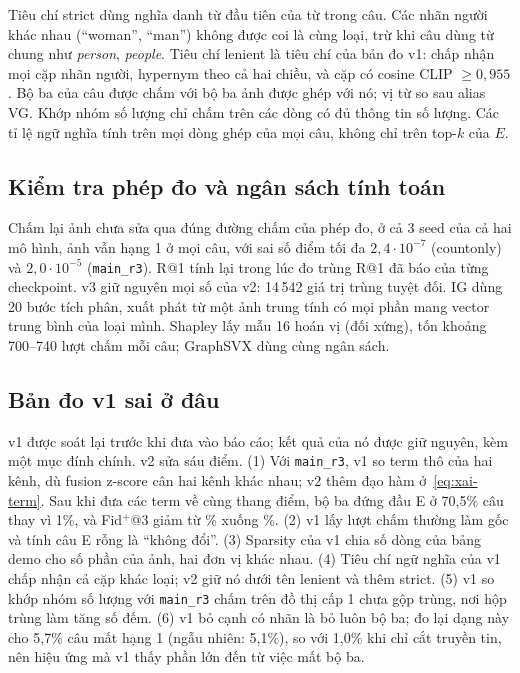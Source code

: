Tiêu chí strict dùng nghĩa danh từ đầu tiên của từ trong câu. Các nhãn người khác nhau (``woman'', ``man'') không được coi là
cùng loại, trừ khi câu dùng từ chung như \emph{person}, \emph{people}. Tiêu chí lenient là tiêu chí của bản đo v1: chấp nhận
mọi cặp nhãn người, hypernym theo cả hai chiều, và cặp có cosine CLIP $\ge0{,}955$. Bộ ba của câu được chấm với bộ ba ảnh được
ghép với nó; vị từ so sau alias VG. Khớp nhóm số lượng chỉ chấm trên các dòng có đủ thông tin số lượng. Các tỉ lệ ngữ nghĩa
tính trên mọi dòng ghép của mọi câu, không chỉ trên top-$k$ của $E$.

\subsection{Kiểm tra phép đo và ngân sách tính toán}\label{sec:xai-checks}
Chấm lại ảnh chưa sửa qua đúng đường chấm của phép đo, ở cả 3 seed của cả hai mô hình, ảnh vẫn hạng 1 ở mọi câu, với sai số
điểm tối đa $2{,}4\cdot10^{-7}$ (countonly) và $2{,}0\cdot10^{-5}$ (\texttt{main\_r3}). R@1 tính lại trong lúc đo trùng R@1
đã báo của từng checkpoint. v3 giữ nguyên mọi số của v2: 14\,542 giá trị trùng tuyệt đối.
IG dùng 20 bước tích phân, xuất phát từ một ảnh trung tính có mọi phần mang vector trung bình của loại mình. Shapley lấy mẫu
16 hoán vị (đối xứng), tốn khoảng 700--740 lượt chấm mỗi câu; GraphSVX dùng cùng ngân sách.

\subsection{Bản đo v1 sai ở đâu}\label{sec:xai-v1v2}
v1 được soát lại trước khi đưa vào báo cáo; kết quả của nó được giữ nguyên, kèm một mục đính chính.
v2 sửa sáu điểm.
(1) Với \texttt{main\_r3}, v1 so term thô của hai kênh, dù fusion z-score cân hai kênh khác nhau; v2 thêm đạo hàm
ở~\eqref{eq:xai-term}. Sau khi đưa các term về cùng thang điểm, bộ ba đứng đầu E ở 70,5\% câu thay vì 1\%, và Fid$^{+}$@3
giảm từ \% xuống \%.
(2) v1 lấy lượt chấm thường làm gốc và tính câu E rỗng là ``không đổi''.
(3) Sparsity của v1 chia số dòng của bảng demo cho số phần của ảnh, hai đơn vị khác nhau.
(4) Tiêu chí ngữ nghĩa của v1 chấp nhận cả cặp khác loại; v2 giữ nó dưới tên lenient và thêm strict.
(5) v1 so khớp nhóm số lượng với \texttt{main\_r3} chấm trên đồ thị cấp 1 chưa gộp trùng, nơi hộp trùng làm tăng số đếm.
(6) v1 bỏ cạnh có nhãn là bỏ luôn bộ ba; đo lại dạng này cho 5,7\% câu mất hạng 1 (ngẫu nhiên: 5,1\%), so với 1,0\% khi chỉ
cắt truyền tin, nên hiệu ứng mà v1 thấy phần lớn đến từ việc mất bộ ba.
